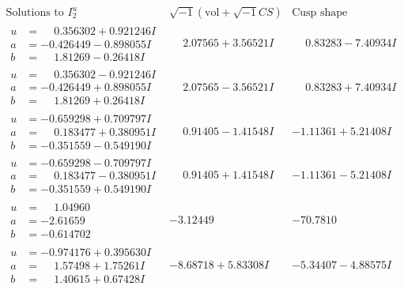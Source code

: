\documentclass[1p]{elsarticle_modified}
\theoremstyle{definition}
\newcommand{\I}{\sqrt{-1}}
\begin{document}
$$\begin{array}{c|c|c}  
\text{Solutions to }I^u_{2}& \I (\text{vol} + \sqrt{-1}CS) & \text{Cusp shape}\\
 \hline 
\begin{aligned}
u &= \phantom{-}0.356302 + 0.921246 I \\
a &= -0.426449 - 0.898055 I \\
b &= \phantom{-}1.81269 - 0.26418 I\end{aligned}
 & \phantom{-}2.07565 + 3.56521 I & \phantom{-}0.83283 - 7.40934 I \\ \hline\begin{aligned}
u &= \phantom{-}0.356302 - 0.921246 I \\
a &= -0.426449 + 0.898055 I \\
b &= \phantom{-}1.81269 + 0.26418 I\end{aligned}
 & \phantom{-}2.07565 - 3.56521 I & \phantom{-}0.83283 + 7.40934 I \\ \hline\begin{aligned}
u &= -0.659298 + 0.709797 I \\
a &= \phantom{-}0.183477 + 0.380951 I \\
b &= -0.351559 - 0.549190 I\end{aligned}
 & \phantom{-}0.91405 - 1.41548 I & -1.11361 + 5.21408 I \\ \hline\begin{aligned}
u &= -0.659298 - 0.709797 I \\
a &= \phantom{-}0.183477 - 0.380951 I \\
b &= -0.351559 + 0.549190 I\end{aligned}
 & \phantom{-}0.91405 + 1.41548 I & -1.11361 - 5.21408 I \\ \hline\begin{aligned}
u &= \phantom{-}1.04960\phantom{ +0.000000I} \\
a &= -2.61659\phantom{ +0.000000I} \\
b &= -0.614702\phantom{ +0.000000I}\end{aligned}
 & -3.12449\phantom{ +0.000000I} & -70.7810\phantom{ +0.000000I} \\ \hline\begin{aligned}
u &= -0.974176 + 0.395630 I \\
a &= \phantom{-}1.57498 + 1.75261 I \\
b &= \phantom{-}1.40615 + 0.67428 I\end{aligned}
 & -8.68718 + 5.83308 I & -5.34407 - 4.88575 I \\ \hline\begin{aligned}

\end{aligned}
\end{array}$$
\end{document}

